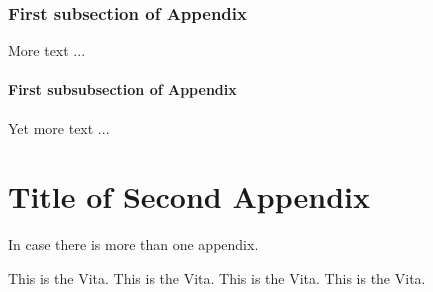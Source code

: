 \documentclass[12pt]{nuthesis}	%
\begin{document}
\subsection{First subsection of Appendix}  %

More text ...

\subsubsection{First subsubsection of Appendix}  %

Yet more text ...

\chapter{Title of Second Appendix}

In case there is more than one appendix.


\begin{vita}                    %

This is the Vita. This is the Vita. This is the Vita. This is the Vita. 


\end{vita}
\end{document}
